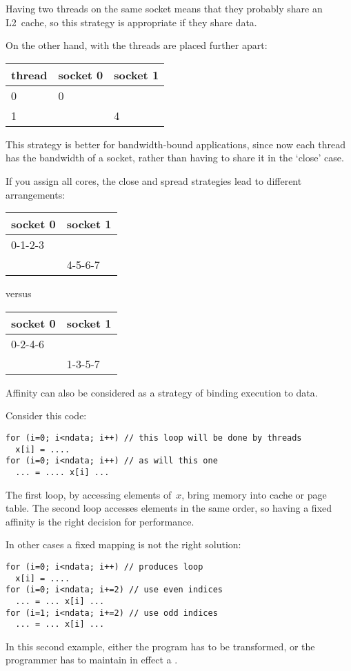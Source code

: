 Having two threads on the same socket means that they probably share
an L2~cache, so this strategy is appropriate if they share data.

On the other hand, with  the threads
are placed further apart:\\
\begin{tabular}{|l|l|l|}
  \hline
  thread & socket 0 & socket 1\\
  \hline \hline
  0 & 0 & \\
  1 & & 4 \\
  \hline
\end{tabular}

This strategy is better for bandwidth-bound applications, since now
each thread has the bandwidth of a socket, rather than having to share
it in the `close' case.

If you assign all cores, the close and spread strategies lead to
different arrangements:\\
\begin{tabular}{|l|l|}
  \hline
  socket 0 & socket 1\\
  \hline \hline
  0-1-2-3 & \\
  & 4-5-6-7\\
  \hline
\end{tabular}

versus\\
\begin{tabular}{|l|l|}
  \hline
  socket 0 & socket 1\\
  \hline \hline
  0-2-4-6 & \\
  & 1-3-5-7 \\
  \hline
\end{tabular}


Affinity can also be considered as a strategy of binding execution to data.

Consider this code:
\begin{verbatim}
for (i=0; i<ndata; i++) // this loop will be done by threads
  x[i] = ....
for (i=0; i<ndata; i++) // as will this one
  ... = .... x[i] ...
\end{verbatim}
The first loop, by accessing elements of~$x$, bring memory into cache
or page table. The second loop accesses elements in the same order, so
having a fixed affinity is the right decision for performance.

In other cases a fixed mapping is not the right solution:
\begin{verbatim}
for (i=0; i<ndata; i++) // produces loop
  x[i] = ....
for (i=0; i<ndata; i+=2) // use even indices
  ... = ... x[i] ...
for (i=1; i<ndata; i+=2) // use odd indices
  ... = ... x[i] ...
\end{verbatim}
In this second example, either the program has to be transformed, or
the programmer has to maintain in effect a .


